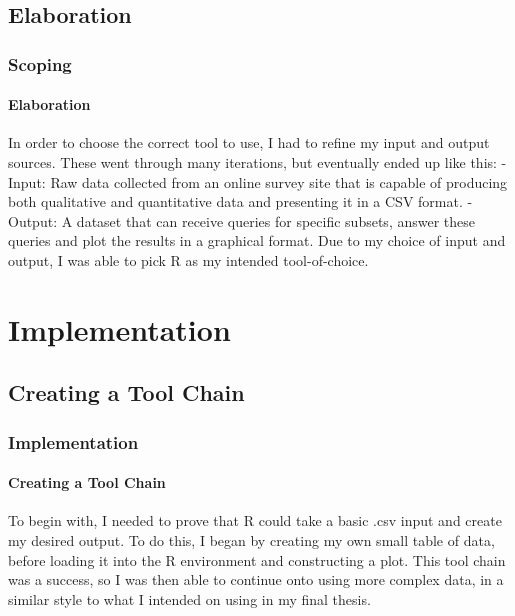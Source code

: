 \documentclass{beamer}
\begin{document}
\subsection{Elaboration}
\begin{frame}
\frametitle{Scoping}
\framesubtitle{Elaboration}
In order to choose the correct tool to use, I had to refine my input and output sources. These went through many iterations, but eventually ended up like this:
\newline
\newline
- Input: Raw data collected from an online survey site that is capable of producing both qualitative and quantitative data and presenting it in a CSV format.
\newline
- Output: A dataset that can receive queries for specific subsets, answer these queries and plot the results in a graphical format.
\newline
\newline
Due to my choice of input and output, I was able to pick R as my intended tool-of-choice.
\end{frame}

\section{Implementation}
\subsection{Creating a Tool Chain}
\begin{frame}
\frametitle{Implementation}
\framesubtitle{Creating a Tool Chain}
To begin with, I needed to prove that R could take a basic .csv input and create my desired output. To do this, I began by creating my own small table of data, before loading it into the R environment and constructing a plot.  
\newline
\newline
This tool chain was a success, so I was then able to continue onto using more complex data, in a similar style to what I intended on using in my final thesis.
\end{frame}

\end{document}
